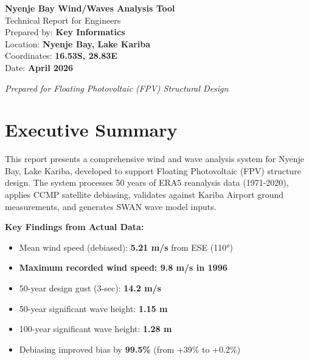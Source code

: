 \documentclass[12pt]{article}
\begin{document}
\begin{center}
    \vspace*{2cm}
    
    {\huge\bfseries Nyenje Bay Wind/Waves Analysis Tool}\\[0.5cm]
    {\Large Technical Report for Engineers}\\[2cm]
    
    {\large Prepared by: \textbf{Key Informatics}}\\[0.3cm]
    {\large Location: \textbf{Nyenje Bay, Lake Kariba}}\\[0.3cm]
    {\large Coordinates: \textbf{16.53S, 28.83E}}\\[0.3cm]
    {\large Date: \textbf{April 2026}}\\[2cm]
    
    \vfill
    
    {\large \textit{Prepared for Floating Photovoltaic (FPV) Structural Design}}
\end{center}

\newpage
\tableofcontents
\newpage

\section*{Executive Summary}

This report presents a comprehensive wind and wave analysis system for Nyenje Bay, Lake Kariba, developed to support Floating Photovoltaic (FPV) structure design. The system processes 50 years of ERA5 reanalysis data (1971-2020), applies CCMP satellite debiasing, validates against Kariba Airport ground measurements, and generates SWAN wave model inputs.

\vspace{0.5cm}

\textbf{Key Findings from Actual Data:}
\begin{itemize}
    \item Mean wind speed (debiased): \textbf{5.21 m/s} from ESE (110°)
    \item \textbf{Maximum recorded wind speed: 9.8 m/s in 1996}
    \item 50-year design gust (3-sec): \textbf{14.2 m/s}
    \item 50-year significant wave height: \textbf{1.15 m}
    \item 100-year significant wave height: \textbf{1.28 m}
    \item Debiasing improved bias by \textbf{99.5\%} (from +39\% to +0.2\%)
\end{itemize}
\end{document}
